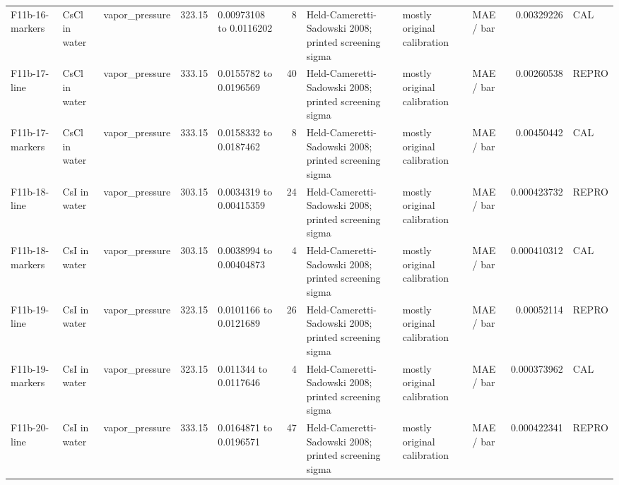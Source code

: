 \begin{landscape}
\begin{longtable}{L{1.9cm}L{2.5cm}L{2.1cm}L{1.6cm}L{1.6cm}rL{2.4cm}L{1.9cm}L{2.2cm}rL{1cm}}
F11b-\allowbreak{}16-\allowbreak{}markers & CsCl in water & vapor\_\allowbreak{}pressure & 323.15 & 0.00973108 to 0.0116202 & 8 & Held-\allowbreak{}Cameretti-\allowbreak{}Sadowski 2008; printed screening sigma & mostly original calibration & MAE /\allowbreak{} bar & 0.00329226 & CAL \\
F11b-\allowbreak{}17-\allowbreak{}line & CsCl in water & vapor\_\allowbreak{}pressure & 333.15 & 0.0155782 to 0.0196569 & 40 & Held-\allowbreak{}Cameretti-\allowbreak{}Sadowski 2008; printed screening sigma & mostly original calibration & MAE /\allowbreak{} bar & 0.00260538 & REPRO \\
F11b-\allowbreak{}17-\allowbreak{}markers & CsCl in water & vapor\_\allowbreak{}pressure & 333.15 & 0.0158332 to 0.0187462 & 8 & Held-\allowbreak{}Cameretti-\allowbreak{}Sadowski 2008; printed screening sigma & mostly original calibration & MAE /\allowbreak{} bar & 0.00450442 & CAL \\
F11b-\allowbreak{}18-\allowbreak{}line & CsI in water & vapor\_\allowbreak{}pressure & 303.15 & 0.0034319 to 0.00415359 & 24 & Held-\allowbreak{}Cameretti-\allowbreak{}Sadowski 2008; printed screening sigma & mostly original calibration & MAE /\allowbreak{} bar & 0.000423732 & REPRO \\
F11b-\allowbreak{}18-\allowbreak{}markers & CsI in water & vapor\_\allowbreak{}pressure & 303.15 & 0.0038994 to 0.00404873 & 4 & Held-\allowbreak{}Cameretti-\allowbreak{}Sadowski 2008; printed screening sigma & mostly original calibration & MAE /\allowbreak{} bar & 0.000410312 & CAL \\
F11b-\allowbreak{}19-\allowbreak{}line & CsI in water & vapor\_\allowbreak{}pressure & 323.15 & 0.0101166 to 0.0121689 & 26 & Held-\allowbreak{}Cameretti-\allowbreak{}Sadowski 2008; printed screening sigma & mostly original calibration & MAE /\allowbreak{} bar & 0.00052114 & REPRO \\
F11b-\allowbreak{}19-\allowbreak{}markers & CsI in water & vapor\_\allowbreak{}pressure & 323.15 & 0.011344 to 0.0117646 & 4 & Held-\allowbreak{}Cameretti-\allowbreak{}Sadowski 2008; printed screening sigma & mostly original calibration & MAE /\allowbreak{} bar & 0.000373962 & CAL \\
F11b-\allowbreak{}20-\allowbreak{}line & CsI in water & vapor\_\allowbreak{}pressure & 333.15 & 0.0164871 to 0.0196571 & 47 & Held-\allowbreak{}Cameretti-\allowbreak{}Sadowski 2008; printed screening sigma & mostly original calibration & MAE /\allowbreak{} bar & 0.000422341 & REPRO \\

\end{longtable}
\end{landscape}
